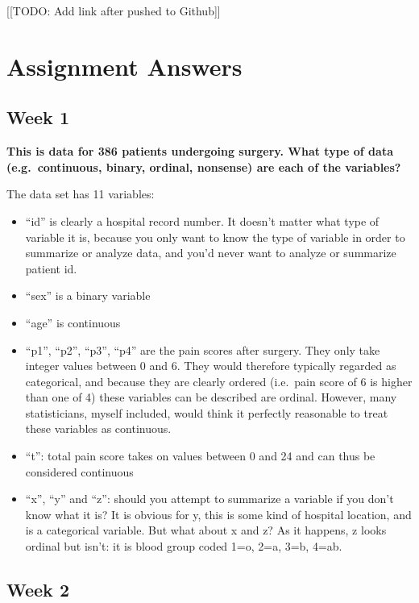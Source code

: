 \documentclass[]{book}
\providecommand{\tightlist}{%
  \setlength{\itemsep}{0pt}\setlength{\parskip}{0pt}}
\begin{document}
{[}{[}TODO: Add link after pushed to Github{]}{]}

\hypertarget{assignment-answers}{%
\chapter{Assignment Answers}\label{assignment-answers}}

\hypertarget{week-1-1}{%
\section{Week 1}\label{week-1-1}}

\textbf{This is data for 386 patients undergoing surgery. What type of
data (e.g.~continuous, binary, ordinal, nonsense) are each of the
variables?}

The data set has 11 variables:

\begin{itemize}
\tightlist
\item
  ``id'' is clearly a hospital record number. It doesn't matter what
  type of variable it is, because you only want to know the type of
  variable in order to summarize or analyze data, and you'd never want
  to analyze or summarize patient id.
\item
  ``sex'' is a binary variable
\item
  ``age'' is continuous
\item
  ``p1'', ``p2'', ``p3'', ``p4'' are the pain scores after surgery. They
  only take integer values between 0 and 6. They would therefore
  typically regarded as categorical, and because they are clearly
  ordered (i.e.~pain score of 6 is higher than one of 4) these variables
  can be described are ordinal. However, many statisticians, myself
  included, would think it perfectly reasonable to treat these variables
  as continuous.
\item
  ``t'': total pain score takes on values between 0 and 24 and can thus
  be considered continuous
\item
  ``x'', ``y'' and ``z'': should you attempt to summarize a variable if
  you don't know what it is? It is obvious for y, this is some kind of
  hospital location, and is a categorical variable. But what about x and
  z? As it happens, z looks ordinal but isn't: it is blood group coded
  1=o, 2=a, 3=b, 4=ab.
\end{itemize}

\hypertarget{week-2-1}{%
\section{Week 2}\label{week-2-1}}
\end{document}
